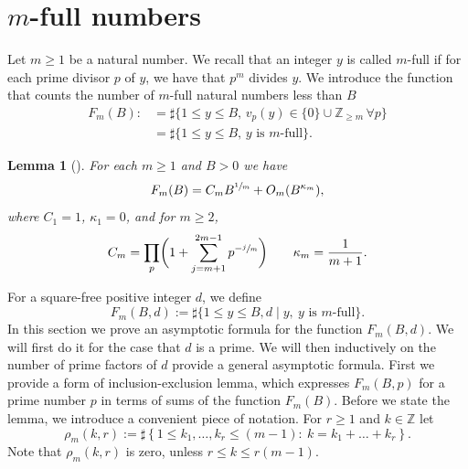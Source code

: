 \documentclass[JEP,XML,SOM,Unicode,published]{cedram}
\let\kap\kappa
\newcommand\ZZ{\mathbb{Z}}
\newcommand{\Z}{\mathbb{Z}}
\newtheorem{lemma}[theorem]{Lemma}
\theoremstyle{definition}
\numberwithin{theorem}{section}
\begin{document}
\section{\texorpdfstring{$m$}{m}-full numbers}
\label{sec:m-full}
Let $m\geq 1$ be a natural number. We recall that an integer $y$ is called $m$-full if for each prime divisor $p$ of $y$, we have that $p^m$ divides $y$.
We introduce the function that counts the number of $m$-full natural numbers less than $B$
\begin{equation*}
\begin{split}
F_m(B):\!&=\sharp\{1\leq y\leq B,\, v_p(y)\in\{0\}\cup\ZZ_{\geq m}\,\forall p\}\\
&= \sharp\{1\leq y\leq B,\, y \mbox{ is $m$-full}\}.
\end{split}
\end{equation*}

\begin{lemma}[{\cite{erdos, MR0095804}}]
For each $m\geq 1$ and $B>0$ we have
\begin{equation}\label{eqnm}
F_m(B)=C_mB^{\sfrac{1}{m}}+O_m(B^{\kap_m}),
\end{equation}
where $C_1=1$, $\kap_1=0$, and for $m\geq 2$,
\begin{equation}
\label{eq:C_m_explicit}
C_m=\prod_p\biggl(1+\sum_{j=m+1}^{2m-1}p^{-\sfrac jm}\biggr) \qquad
\kap_m=\frac1{m+1}.
\end{equation}
\end{lemma}

For a square-free positive integer $d$, we define
\begin{equation}
\label{eq:FmBd_defin}
F_m(B,d):= \sharp\{1\leq y\leq B, d\mid y,\ y\mbox{ is $m$-full}\}.
\end{equation}
In this section we prove an asymptotic formula for the function $F_m(B,d)$.
We will first do it for the case that $d$ is a prime. We will then inductively on the number of prime factors of $d$ provide a general asymptotic formula.
First we provide a form of inclusion-exclusion lemma, which expresses $F_m(B,p)$ for a prime number $p$ in terms of sums of the function $F_m(B)$. Before we state the lemma, we introduce a convenient piece of notation. For $r\geq 1$ and $k\in \Z$ let
\[
\rho_m(k,r):= \sharp\left\{1\leq k_1,\ldots, k_r\leq (m-1):\ k=k_1+\ldots + k_r\right\}.
\]
Note that $\rho_m(k,r)$ is zero, unless $r\leq k\leq r(m-1)$.\par
\end{document}
